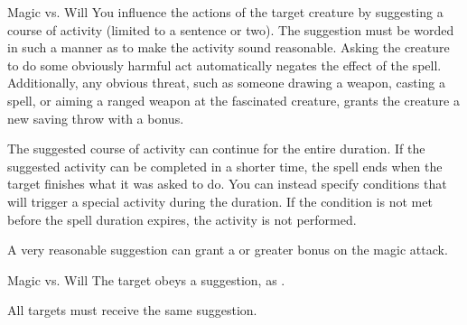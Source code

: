 \begin{spellheader}
    \spellrng{\rngclose}
\end{spellheader}
\begin{spelleffects}
    \begin{spellattack}{Magic vs. Will}
        \spelleffect You influence the actions of the target creature by suggesting a course of activity (limited to a sentence or two). The suggestion must be worded in such a manner as to make the activity sound reasonable. Asking the creature to do some obviously harmful act automatically negates the effect of the spell. Additionally, any obvious threat, such as someone drawing a weapon, casting a spell, or aiming a ranged weapon at the fascinated creature, grants the creature a new saving throw with a  bonus.
        \par The suggested course of activity can continue for the entire duration. If the suggested activity can be completed in a shorter time, the spell ends when the target finishes what it was asked to do. You can instead specify conditions that will trigger a special activity during the duration. If the condition is not met before the spell duration expires, the activity is not performed.
    \end{spellattack}
\end{spelleffects}
\begin{spellfooter}
    \spellnotes A very reasonable suggestion can grant a  or greater bonus on the magic attack.

    \norepeatspellnotes
\end{spellfooter}

\begin{spellheader}
    \spelldur{\durmed}
\end{spellheader}
\begin{spelleffects}
    \begin{spellattack}{Magic vs. Will}
        \spelleffect The target obeys a suggestion, as .
    \end{spellattack}
\end{spelleffects}
\begin{spellfooter}
    \spellnotes All targets must receive the same suggestion.
\end{spellfooter}

